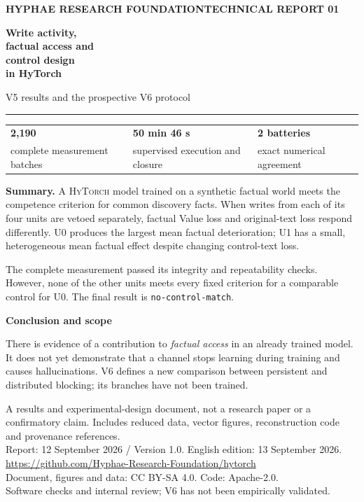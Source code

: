 \documentclass[11pt,a4paper]{article}
\newcommand{\sys}{\textsc{HyTorch}}
\newcommand{\status}{\texttt{no-control-match}}
\newcommand{\callout}[2]{\par\vspace{3pt}\begingroup\setlength{\fboxsep}{9pt}%
  \colorbox{light}{\begin{minipage}{\dimexpr\linewidth-2\fboxsep\relax}%
  {\sffamily\bfseries\color{ink}#1}\par\small #2\end{minipage}}\endgroup\par\vspace{3pt}}
\begin{document}
\thispagestyle{empty}

{\sffamily\bfseries\color{teal}\small HYPHAE RESEARCH FOUNDATION\hfill TECHNICAL REPORT 01}
\vspace{15mm}

{\sffamily\bfseries\color{ink}\fontsize{29}{34}\selectfont
Write activity,\\
factual access and\\
control design\\
in HyTorch\par}
\vspace{5mm}
{\sffamily\large\color{muted}V5 results and the prospective V6 protocol}

\vspace{6mm}
{\color{teal}\rule{\linewidth}{1.2pt}}
\vspace{2mm}

\begin{tabularx}{\linewidth}{@{}YYY@{}}
{\sffamily\bfseries\Large 2,190} & {\sffamily\bfseries\Large 50 min 46 s} & {\sffamily\bfseries\Large 2 batteries}\\[-2pt]
{\small complete measurement batches} & {\small supervised execution and closure} & {\small exact numerical agreement}\\
\end{tabularx}

\vspace{6mm}
\textbf{Summary.} A \sys{} model trained on a synthetic factual world meets the
competence criterion for common discovery facts. When writes from each of its
four units are vetoed separately, factual Value loss and original-text loss
respond differently. U0 produces the largest mean factual deterioration; U1 has
a small, heterogeneous mean factual effect despite changing control-text loss.

The complete measurement passed its integrity and repeatability checks.
However, none of the other units meets every fixed criterion for a comparable
control for U0. The final result is \status.

\callout{Conclusion and scope}{
There is evidence of a contribution to \emph{factual access} in an already
trained model. It does not yet demonstrate that a channel stops learning during
training and causes hallucinations. V6 defines a new comparison between
persistent and distributed blocking; its branches have not been trained.}

\vfill
{\small\color{muted}
A results and experimental-design document, not a research paper or a
confirmatory claim. Includes reduced data, vector figures, reconstruction code
and provenance references.\\[4pt]
Report: 12 September 2026 / Version 1.0. English edition: 13 September 2026.\\
\url{https://github.com/Hyphae-Research-Foundation/hytorch}\\[4pt]
Document, figures and data: CC BY-SA 4.0. Code: Apache-2.0.\\
Software checks and internal review; V6 has not been empirically validated.}
\end{document}
